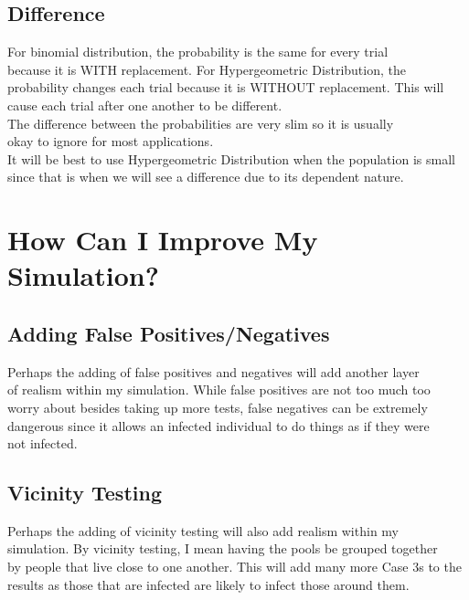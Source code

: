 \documentclass[letterpaper, 10pt]{article}
\begin{document}
\subsection{Difference}
For binomial distribution, the probability is the same for every trial\\
because it is WITH replacement. For Hypergeometric Distribution, the \\ probability changes each trial because it is WITHOUT replacement. This will\\
cause each trial after one another to be different.\\
The difference between the probabilities are very slim so it is usually\\
okay to ignore for most applications.\\
It will be best to use Hypergeometric Distribution when the population is small\\ since that is when we will see a difference due to its dependent nature.\\

\section{How Can I Improve My Simulation?}
\subsection{Adding False Positives/Negatives}
Perhaps the adding of false positives and negatives will add another layer\\
of realism within my simulation. While false positives are not too much too\\
worry about besides taking up more tests, false negatives can be extremely\\
dangerous since it allows an infected individual to do things as if they were \\
not infected.

\subsection{Vicinity Testing}
Perhaps the adding of vicinity testing will also add realism within my\\ simulation. By vicinity testing, I mean having the pools be grouped together \\
by people that live close to one another. This will add many more Case 3s to the
results as those that are infected are likely to infect those around them.\\
\end{document}
